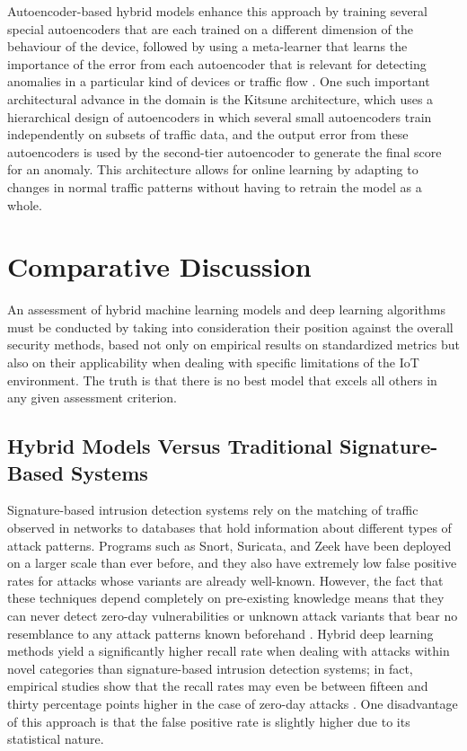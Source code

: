 \documentclass[12pt]{article}
\begin{document}
Autoencoder-based hybrid models enhance this approach by training several special autoencoders that are each trained on a different dimension of the behaviour of the device, followed by using a meta-learner that learns the importance of the error from each autoencoder that is relevant for detecting anomalies in a particular kind of devices or traffic flow \cite{mirsky2018kitsune}. One such important architectural advance in the domain is the Kitsune architecture, which uses a hierarchical design of autoencoders in which several small autoencoders train independently on subsets of traffic data, and the output error from these autoencoders is used by the second-tier autoencoder to generate the final score for an anomaly. This architecture allows for online learning by adapting to changes in normal traffic patterns without having to retrain the model as a whole.


\section{Comparative Discussion}

An assessment of hybrid machine learning models and deep learning algorithms must be conducted by taking into consideration their position against the overall security methods, based not only on empirical results on standardized metrics but also on their applicability when dealing with specific limitations of the IoT environment. The truth is that there is no best model that excels all others in any given assessment criterion.

\subsection{Hybrid Models Versus Traditional Signature-Based Systems}

Signature-based intrusion detection systems rely on the matching of traffic observed in networks to databases that hold information about different types of attack patterns. Programs such as Snort, Suricata, and Zeek have been deployed on a larger scale than ever before, and they also have extremely low false positive rates for attacks whose variants are already well-known. However, the fact that these techniques depend completely on pre-existing knowledge means that they can never detect zero-day vulnerabilities or unknown attack variants that bear no resemblance to any attack patterns known beforehand \cite{ferrag2020deep}. Hybrid deep learning methods yield a significantly higher recall rate when dealing with attacks within novel categories than signature-based intrusion detection systems; in fact, empirical studies show that the recall rates may even be between fifteen and thirty percentage points higher in the case of zero-day attacks \cite{thamilarasu2019towards}. One disadvantage of this approach is that the false positive rate is slightly higher due to its statistical nature.
\end{document}
